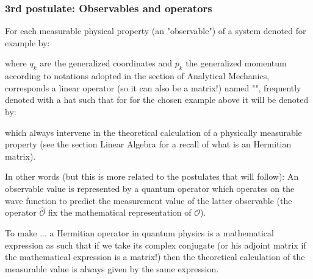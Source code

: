 	\subsubsection{3rd postulate: Observables and operators}\label{observables and operators}
	For each measurable physical property (an "observable") of a system denoted for example by:
	
	where $q_k$ are the generalized coordinates and $p_k$ the generalized momentum according to notations adopted in the section of Analytical Mechanics, corresponds a linear operator (so it can also be a matrix!) named "\label{hermitian operator}", frequently denoted with a hat such that for for the chosen example above it will be denoted by:
	
	which always intervene in the theoretical calculation of a physically measurable property (see the section Linear Algebra for a recall of what is an Hermitian matrix).
	
	In other words (but this is more related to the postulates that will follow): An observable value is represented by a quantum operator which operates on the wave function to predict the measurement value of the latter observable (the operator $\hat{\mathcal{O}}$ fix the mathematical representation of $\mathcal{O}$).
	
	To make ... a Hermitian operator in quantum physics is a mathematical expression as such that if we take its complex conjugate (or his adjoint matrix if the mathematical expression is a matrix!) then the theoretical calculation of the measurable value is always given by the same expression.
	
